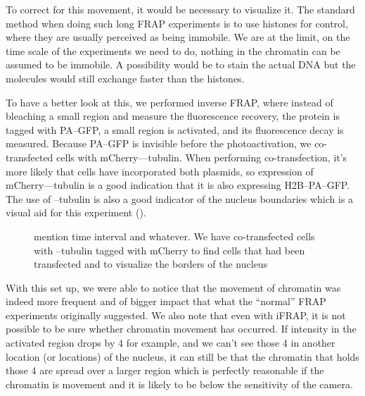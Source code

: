   To correct for this movement, it would be necessary to visualize it. The standard method when doing such long
  FRAP experiments is to use histones for control, where they are usually perceived as being immobile. We are
  at the limit, on the time scale of the experiments we need to do, nothing in the chromatin can be assumed
  to be immobile. A possibility would be to stain the actual DNA but the molecules would still exchange faster
  than the histones.
  
  To have a better look at this, we performed inverse FRAP, where instead of bleaching a small region
  and measure the fluorescence recovery, the protein is tagged with PA--GFP, a small region is
  activated, and its fluorescence decay is measured. Because PA--GFP is invisible before the photoactivation,
  we co-transfected cells with mCherry--\textalpha--tubulin. When performing co-transfection, it's more likely
  that cells have incorporated both plasmids, so expression of
  mCherry--\textalpha--tubulin is a good indication that it is also expressing H2B--PA--GFP. The use of
  \textalpha--tubulin is also a good indicator of the nucleus boundaries which is a visual aid for this
  experiment ().
  
  \begin{figure}
    \centering
                 {mention time interval and whatever. We have co-transfected cells with \textalpha--tubulin
                  tagged with mCherry to find cells that had been transfected and to visualize the borders
                  of the nucleus}
    \label{fig:ifrap-chromatin-movement}
  \end{figure}
  
  With this set up, we were able to notice that the movement of chromatin was indeed more frequent and of
  bigger impact that what the ``normal'' FRAP experiments originally suggested. We also note that even with
  iFRAP, it is not possible to be sure whether chromatin movement has occurred. If intensity in the activated
  region drops by 4 for example, and we can't see those 4 in another location (or locations) of the nucleus,
  it can still be
  that the chromatin that holds those 4 are spread over a larger region which is perfectly reasonable if the
  chromatin is movement and it is likely to be below the sensitivity of the camera.
  
